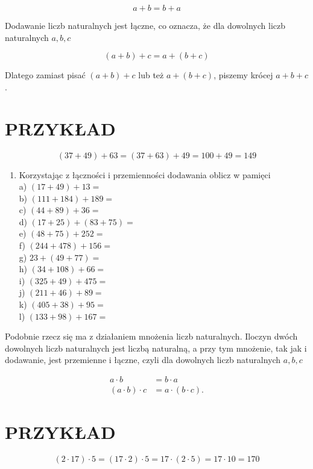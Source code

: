 \documentclass[10pt]{article}
\begin{document}
\[
a+b=b+a
\]

Dodawanie liczb naturalnych jest łączne, co oznacza, że dla dowolnych liczb naturalnych \(a, b, c\)

\[
(a+b)+c=a+(b+c)
\]

Dlatego zamiast pisać \((a+b)+c\) lub też \(a+(b+c)\), piszemy krócej \(a+b+c\).

\section*{PRZYKŁAD}
\[
(37+49)+63=(37+63)+49=100+49=149
\]

\begin{enumerate}
  \item Korzystając z łączności i przemienności dodawania oblicz w pamięci\\
a) \((17+49)+13=\)\\
b) \((111+184)+189=\)\\
c) \((44+89)+36=\)\\
d) \((17+25)+(83+75)=\)\\
e) \((48+75)+252=\)\\
f) \((244+478)+156=\)\\
g) \(23+(49+77)=\)\\
h) \((34+108)+66=\)\\
i) \((325+49)+475=\)\\
j) \((211+46)+89=\)\\
k) \((405+38)+95=\)\\
l) \((133+98)+167=\)
\end{enumerate}

Podobnie rzecz się ma z działaniem mnożenia liczb naturalnych. Iloczyn dwóch dowolnych liczb naturalnych jest liczbą naturalną, a przy tym mnożenie, tak jak i dodawanie, jest przemienne i łączne, czyli dla dowolnych liczb naturalnych \(a, b, c\)

\[
\begin{aligned}
a \cdot b & =b \cdot a \\
(a \cdot b) \cdot c & =a \cdot(b \cdot c) .
\end{aligned}
\]

\section*{PRZYKŁAD}
\[
(2 \cdot 17) \cdot 5=(17 \cdot 2) \cdot 5=17 \cdot(2 \cdot 5)=17 \cdot 10=170
\]
\end{document}

